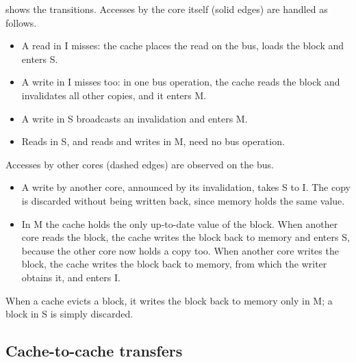 \documentclass[../main.tex]{subfiles}
\begin{document}
 shows the transitions.  Accesses by the core itself
(solid edges) are handled as follows.
\begin{itemize}
  \item A read in I misses: the cache places the read on the bus, loads the
    block and enters S.
  \item A write in I misses too: in one bus operation, the cache reads the
    block and invalidates all other copies, and it enters M.
  \item A write in S broadcasts an invalidation and enters M.
  \item Reads in S, and reads and writes in M, need no bus operation.
\end{itemize}
Accesses by other cores (dashed edges) are observed on the bus.
\begin{itemize}
  \item A write by another core, announced by its invalidation, takes S to
    I.  The copy is discarded without being written back, since memory holds
    the same value.
  \item In M the cache holds the only up-to-date value of the block.  When
    another core reads the block, the cache writes the block back to memory
    and enters S, because the other core now holds a copy too.  When another
    core writes the block, the cache writes the block back to memory, from
    which the writer obtains it, and enters I.
\end{itemize}
When a cache evicts a block, it writes the block back to memory only in M; a
block in S is simply discarded.

\subsection{Cache-to-cache transfers}
\label{sec:l19-c2c}
\end{document}
